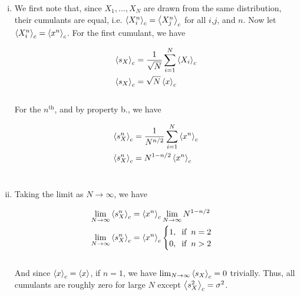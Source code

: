 \documentclass[]{article}
\begin{document}
\begin{enumerate}[i.]

\item We first note that, since $X_1, \dots, X_N$ are drawn from the same distribution, their cumulants are equal, i.e. $\expval{ X_i^n }_c = \expval{ X_j^n }_c$ for all $i$,$j$, and $n$. Now let $\expval{ X_i^n }_c = \expval{x^n}_c$. For the first cumulant, we have

\begin{equation}
\begin{aligned}
\expval{s_X}_c & = \frac{1 }{ \sqrt{N} } \sum_{i=1}^{N} \expval{ X_i }_c \\
\expval{s_X}_c & = \sqrt{N}  \expval{ x}_c \\
\end{aligned}
\end{equation}\\

For the $n^\text{th}$, and by property b., we have

\begin{equation}
\begin{aligned}
\expval{s_X^n}_c & = \frac{1 }{ N^{n/2} } \sum_{i=1}^{N} \expval{ x^n }_c \\
\expval{s_X^n}_c & = N^{1-n/2}\expval{ x^n }_c \\
\end{aligned}
\end{equation}\\

\item Taking the limit as $N\to \infty$, we have

\begin{equation}
\begin{aligned}
\lim_{N \to \infty } \expval{s_X^n}_c & =  \expval{ x^n }_c \lim_{N \to \infty } N^{1-n/2}  \\
\lim_{N \to \infty } \expval{s_X^n}_c & =  \expval{ x^n }_c \begin{cases} 1, \; \; \text{if} \; \; n = 2 \\ 0, \; \; \text{if} \; \;   n>2 \end{cases} \\
\end{aligned}
\end{equation}\\

And since $ \expval{ x }_c =  \expval{ x }$, if $n=1$, we have $\lim_{N \to \infty }  \expval{s_X}_c = 0$ trivially. Thus, all cumulants are roughly zero for large $N$ except $ \expval{s_X^2}_c = \sigma^2$. \\


\end{enumerate}
\end{document}
